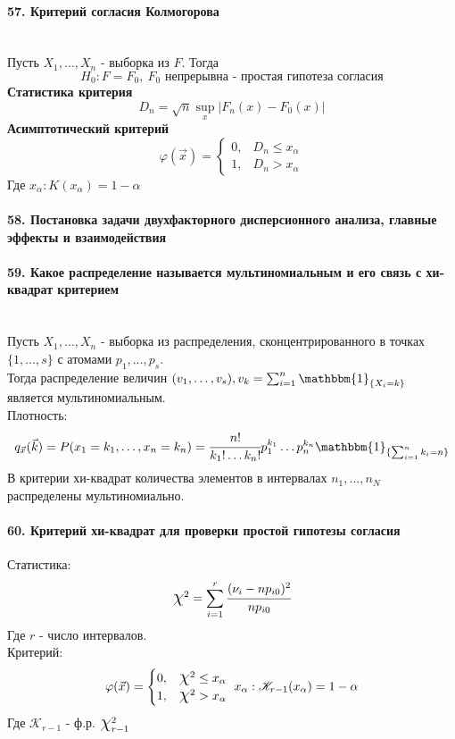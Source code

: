 \documentclass[titlepage]{article}
\newcommand*{\bigchi}{\mbox{\Large$\chi$}} %
\begin{document}
\paragraph{57. Критерий согласия Колмогорова} ~\\
Пусть $X_1,\dots,X_n$ - выборка из $F$. Тогда
\[H_0:F=F_0,\ F_0\text{ непрерывна - простая гипотеза согласия}\]
\textbf{Статистика критерия}
\[D_n = \sqrt{n}\sup_x|F_n(x)-F_0(x)|\]
\textbf{Асимптотический критерий}
\[\varphi(\vec x) = \begin{cases}
	0, &D_n \leq x_\alpha\\
	1, &D_n > x_\alpha
\end{cases}\]
Где $x_\alpha: K(x_\alpha) = 1 - \alpha$

\paragraph{58. Постановка задачи двухфакторного дисперсионного анализа, главные эффекты и взаимодействия}

\paragraph{59. Какое распределение называется мультиномиальным и его связь с хи-квадрат критерием} ~\\
Пусть $X_1,\dots,X_n$ - выборка из распределения, сконцентрированного в точках $\{1,\dots,s\}$ с атомами $p_1,\dots,p_s$.\\
Тогда распределение величин $(v_1,\dots,v_s), v_k=\sum_{i=1}^n\mathbbm{1}_{\{X_i=k\}}$ является мультиномиальным.\\
Плотность:
\[q_{\vec x}(\vec k) = P(x_1 = k_1,\dots,x_n=k_n)=\cfrac{n!}{k_1!\dots k_n!}p_1^{k_1}\dots p_n^{k_n}\mathbbm{1}_{\{\sum_{i=1}^nk_i=n\}}\]
В критерии хи-квадрат количества элементов в интервалах $n_1,\dots,n_N$ распределены мультиномиально.

\paragraph{60. Критерий хи-квадрат для проверки простой гипотезы согласия}
Статистика:
\[\bigchi^2 = \sum_{i=1}^r\cfrac{(\nu_i-np_{i0})^2}{np_{i0}}\]
Где $r$ - число интервалов.\\
Критерий:
\[\varphi(\vec x) = \begin{cases}
	0, &\bigchi^2 \leq x_\alpha\\
	1, &\bigchi^2 > x_\alpha
\end{cases}\ x_\alpha: \mathscr{K}_{r-1}(x_\alpha) = 1 - \alpha\]
Где $\mathscr{K}_{r-1}$ - ф.р. $\bigchi_{r-1}^2$
\end{document}
